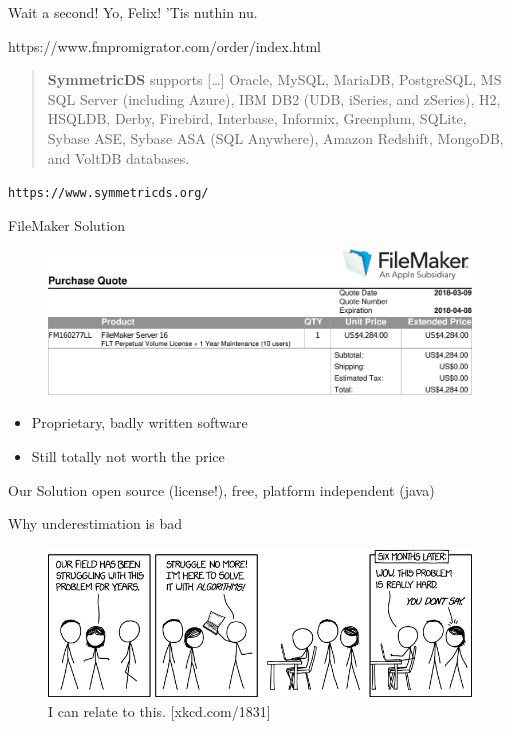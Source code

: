 \documentclass[xcolor=x11names, aspectratio=169,usenames,dvipsnames]{beamer}
\begin{document}
\begin{frame}{Wait a second!}\large
Yo, Felix! 'Tis nuthin nu.\pause\bigskip

https://www.fmpromigrator.com/order/index.html
\normalsize

\begin{quote}
	\textbf{SymmetricDS} supports [\dots] \alert{Oracle}, \alert{MySQL}, MariaDB, \alert{PostgreSQL}, MS SQL Server (including Azure), IBM DB2 (UDB, iSeries, and zSeries), H2, HSQLDB, Derby, Firebird, Interbase, Informix, Greenplum, \alert{SQLite}, Sybase ASE, Sybase ASA (SQL Anywhere), Amazon Redshift, \alert{MongoDB}, and VoltDB databases.
\end{quote}\vspace{-1em}
\begin{flushright}
	\texttt{https://www.symmetricds.org/}
\end{flushright}
\end{frame}

\begin{frame}{FileMaker Solution}
\begin{figure}
\includegraphics[width=\linewidth]{img/order.png}
\end{figure}\vspace{-2em}
\begin{itemize}
\item Proprietary, badly written software
\item Still totally not worth the price
\end{itemize}
\end{frame}

\begin{frame}{Our Solution}
open source (license!), free, platform independent (java)
\end{frame}

\begin{frame}{Why underestimation is bad}
\begin{center}
\begin{figure}
	\includegraphics[width=\textwidth]{img/xkcd.png}
	\caption{I can relate to this. [xkcd.com/1831]}
\end{figure}
\end{center}
\end{frame}
\end{document}
